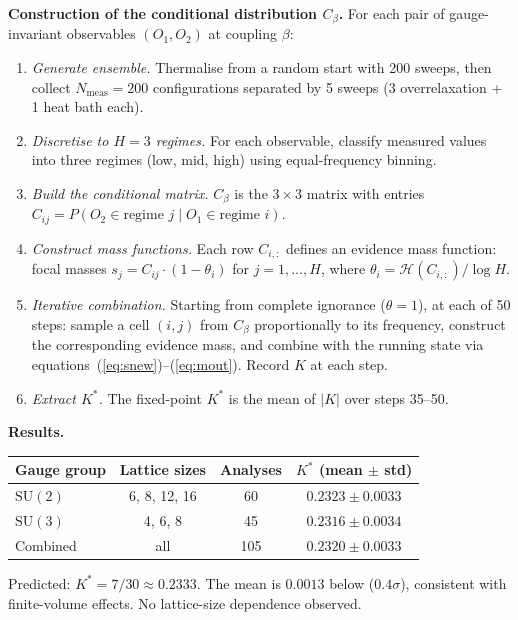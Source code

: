 \documentclass[11pt,a4paper]{article}
\theoremstyle{definition}
\theoremstyle{remark}
\newcommand{\SU}{\mathrm{SU}}
\begin{document}
\textbf{Construction of the conditional distribution $C_\beta$.} For each pair of gauge-invariant observables $(O_1,O_2)$ at coupling $\beta$:
\begin{enumerate}[nosep]
\item \emph{Generate ensemble.} Thermalise from a random start with 200 sweeps, then collect $N_{\mathrm{meas}}=200$ configurations separated by 5 sweeps (3 overrelaxation + 1 heat bath each).
\item \emph{Discretise to $H=3$ regimes.} For each observable, classify measured values into three regimes (low, mid, high) using equal-frequency binning.
\item \emph{Build the conditional matrix.} $C_\beta$ is the $3\times 3$ matrix with entries $C_{ij}=P(O_2\in\text{regime }j\mid O_1\in\text{regime }i)$.
\item \emph{Construct mass functions.} Each row $C_{i,:}$ defines an evidence mass function: focal masses $s_j=C_{ij}\cdot(1-\theta_i)$ for $j=1,\ldots,H$, where $\theta_i=\mathcal{H}(C_{i,:})/\log H$.
\item \emph{Iterative combination.} Starting from complete ignorance ($\theta=1$), at each of 50 steps: sample a cell $(i,j)$ from $C_\beta$ proportionally to its frequency, construct the corresponding evidence mass, and combine with the running state via equations~(\ref{eq:snew})--(\ref{eq:mout}). Record $K$ at each step.
\item \emph{Extract $K^*$.} The fixed-point $K^*$ is the mean of $|K|$ over steps 35--50.
\end{enumerate}

\textbf{Results.}

\begin{center}
\begin{tabular}{lccc}
\toprule
Gauge group & Lattice sizes & Analyses & $K^*$ (mean $\pm$ std) \\
\midrule
$\SU(2)$ & 6, 8, 12, 16 & 60 & $0.2323\pm 0.0033$ \\
$\SU(3)$ & 4, 6, 8 & 45 & $0.2316\pm 0.0034$ \\
Combined & all & 105 & $0.2320\pm 0.0033$ \\
\bottomrule
\end{tabular}
\end{center}

Predicted: $K^*=7/30\approx 0.2333$. The mean is $0.0013$ below ($0.4\sigma$), consistent with finite-volume effects. No lattice-size dependence observed.
\end{document}
